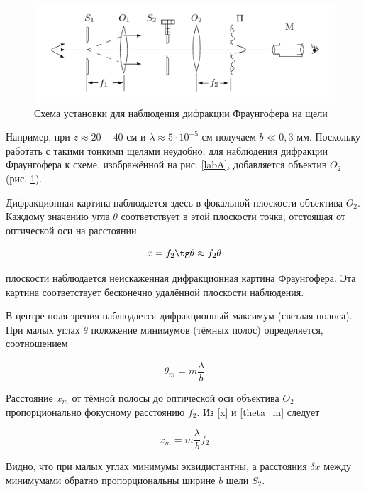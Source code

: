 \documentclass[a4paper,12pt]{article} %
\begin{document}
\begin{figure}[H]
	\centering
	\includegraphics[scale=0.15]{blab.jpeg}
	\caption{Схема установки для наблюдения дифракции Фраунгофера на щели}
	\label{labB}
\end{figure}

Например, при $ z \approx  20-40 $  см и $  \lambda \approx 5 \cdot 10^{-5}  $   см получаем $  b \ll 0,3 $ мм. Поскольку работать с такими тонкими щелями неудобно, для наблюдения дифракции Фраунгофера к схеме, изображённой на рис. \ref{labA}, добавляется объектив $ O_2  $ (рис. \ref{labB}).

Дифракционная картина наблюдается здесь в фокальной плоскости
объектива $ O_2 $. Каждому значению угла $ \theta $ соответствует в этой плоскости точка, отстоящая от оптической оси на расстоянии

\begin{equation}\label{x}
x = f_2 \tg \theta \approx f_2 \theta
\end{equation}


плоскости наблюдается неискаженная дифракционная картина Фраунгофера. Эта картина соответствует бесконечно удалённой плоскости
наблюдения.

В центре поля зрения наблюдается дифракционный максимум (светлая полоса). При малых углах $ \theta $ положение минимумов (тёмных полос)
определяется, соотношением

\begin{equation}\label{theta_m}
\theta_m = m \dfrac{\lambda}{b}
\end{equation}

Расстояние $ x_m $ от тёмной полосы до оптической оси объектива $ O_2 $ пропорционально фокусному расстоянию $ f_2 $. Из \eqref{x} и \eqref{theta_m} следует 

\begin{equation}\label{xm}
x_m = m \dfrac{\lambda}{b} f_2
\end{equation}

Видно, что при малых углах минимумы эквидистантны, а расстояния $ \delta x $ между минимумами обратно пропорциональны ширине $ b $ щели $ S_2 $.
\end{document}
